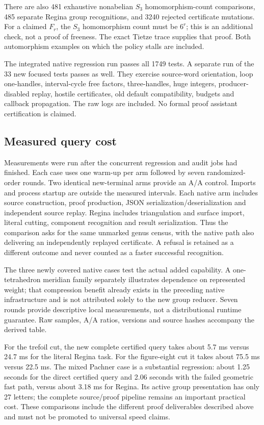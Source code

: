 There are also 481 exhaustive nonabelian $S_3$ homomorphism-count comparisons,
485 separate Regina group recognitions, and 3240 rejected certificate mutations.
For a claimed $F_r$, the $S_3$ homomorphism count must be $6^r$; this is an
additional check, not a proof of freeness. The exact Tietze trace supplies that
proof. Both automorphism examples on which the policy stalls are included.

The integrated native regression run passes all 1749 tests. A separate run of
the 33 new focused tests passes as well. They exercise source-word orientation,
loop one-handles, interval-cycle free factors, three-handles, huge integers,
producer-disabled replay, hostile certificates, old default compatibility,
budgets and callback propagation. The raw logs are included. No formal proof
assistant certification is claimed.

\subsection{Measured query cost}

Measurements were run after the concurrent regression and audit jobs had
finished. Each case uses one warm-up per arm followed by seven randomized-order
rounds. Two identical new-terminal arms provide an A/A control. Imports and
process startup are outside the measured intervals. Each native arm includes
source construction, proof production, JSON serialization/deserialization and
independent source replay. Regina includes triangulation and surface import,
literal cutting, component recognition and result serialization. Thus the
comparison asks for the same unmarked genus census, with the native path also
delivering an independently replayed certificate. A refusal is retained as a
different outcome and never counted as a faster successful recognition.

The three newly covered native cases test the actual added capability. A
one-tetrahedron meridian family separately illustrates dependence on represented
weight; that compression benefit already exists in the preceding native
infrastructure and is not attributed solely to the new group reducer. Seven
rounds provide descriptive local measurements, not a distributional runtime
guarantee. Raw samples, A/A ratios, versions and source hashes accompany the
derived table.



For the trefoil cut, the new complete certified query takes about 5.7 ms versus
24.7 ms for the literal Regina task. For the figure-eight cut it takes about
75.5 ms versus 22.5 ms. The mixed Pachner case is a substantial regression:
about 1.25 seconds for the direct certified query and 2.06 seconds with the
failed geometric fast path, versus about 3.18 ms for Regina. Its active group
presentation has only 27 letters; the complete source/proof pipeline remains
an important practical cost. These comparisons include the different proof
deliverables described above and must not be promoted to universal speed
claims.

